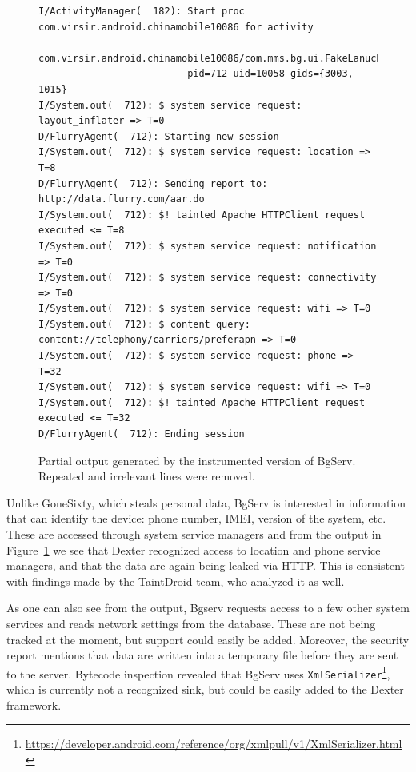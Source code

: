 \documentclass[12pt,twoside,notitlepage]{report}
\newcommand{\weblink}[1] {\footnote{\scriptsize\url{#1}}}
\begin{document}
\begin{figure}[t]
	\scriptsize
	\begin{verbatim}
I/ActivityManager(  182): Start proc com.virsir.android.chinamobile10086 for activity 
                          com.virsir.android.chinamobile10086/com.mms.bg.ui.FakeLanucherActivity: 
                          pid=712 uid=10058 gids={3003, 1015}
I/System.out(  712): $ system service request: layout_inflater => T=0
D/FlurryAgent(  712): Starting new session
I/System.out(  712): $ system service request: location => T=8
D/FlurryAgent(  712): Sending report to: http://data.flurry.com/aar.do
I/System.out(  712): $! tainted Apache HTTPClient request executed <= T=8
I/System.out(  712): $ system service request: notification => T=0
I/System.out(  712): $ system service request: connectivity => T=0
I/System.out(  712): $ system service request: wifi => T=0
I/System.out(  712): $ content query: content://telephony/carriers/preferapn => T=0
I/System.out(  712): $ system service request: phone => T=32
I/System.out(  712): $ system service request: wifi => T=0
I/System.out(  712): $! tainted Apache HTTPClient request executed <= T=32
D/FlurryAgent(  712): Ending session
	\end{verbatim}
	\caption{Partial output generated by the instrumented version of BgServ. Repeated and irrelevant lines were removed.}
	\label{figure:Evaluation_BgServ}
\end{figure}

Unlike GoneSixty, which steals personal data, BgServ is interested in information that can identify the device: phone number, IMEI, version of the system, etc. These are accessed through system service managers and from the output in Figure~\ref{figure:Evaluation_BgServ} we see that Dexter recognized access to location and phone service managers, and that the data are again being leaked via HTTP. This is consistent with findings made by the TaintDroid team, who analyzed it as well.

As one can also see from the output, Bgserv requests access to a few other system services and reads network settings from the database. These are not being tracked at the moment, but support could easily be added. Moreover, the security report mentions that data are written into a temporary file before they are sent to the server. Bytecode inspection revealed that BgServ uses \verb$XmlSerializer$\weblink{https://developer.android.com/reference/org/xmlpull/v1/XmlSerializer.html}, which is currently not a recognized sink, but could be easily added to the Dexter framework.
\end{document}
